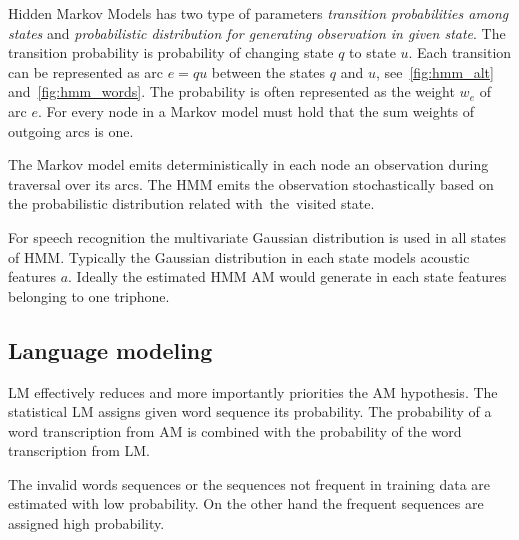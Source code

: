 {
Hidden Markov Models has two type of parameters {\it transition probabilities among states}\/
and {\it probabilistic distribution for generating observation in given state}.
The transition probability is probability of changing state $q$ to state $u$.
Each transition can be represented as arc $e=qu$ between the states $q$ and $u$, see~\ref{fig:hmm_alt} and~\ref{fig:hmm_words}.
The probability is often represented as the weight $w_e$ of arc $e$.
For every node in a Markov model must hold that the sum weights of outgoing arcs is one.

The Markov model emits deterministically in each node an observation during traversal over its arcs.
The \acl{HMM} emits the observation stochastically based on the probabilistic distribution related
with~the~visited state.

For speech recognition the multivariate Gaussian distribution is used in all states of \ac{HMM}. 
Typically the Gaussian distribution in each state models acoustic features $a$.
Ideally the estimated \ac{HMM} \ac{AM} would generate in each state features belonging to one triphone.







\subsection{Language modeling}
\label{sub:lm}

\ac{LM} effectively reduces and more importantly priorities the \ac{AM} hypothesis.
The statistical \ac{LM} assigns given word sequence its probability.
The probability of a word transcription from \ac{AM} is combined with
the probability of the word transcription from \ac{LM}.

The invalid words sequences or the sequences not frequent in training data
are estimated with low probability. On the other hand the frequent sequences
are assigned high probability.

}
